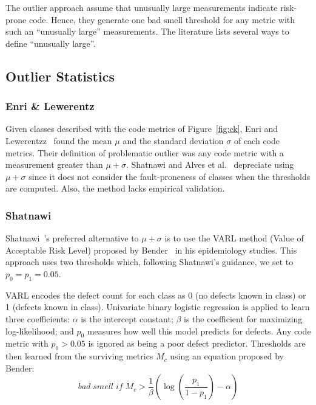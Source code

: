 \documentclass[twocolumn,5p]{elsarticle}
\newcommand{\fig}[1]{Figure~\ref{fig:#1}}
\theoremstyle{break}
\begin{document}
The outlier approach assume that unusually large measurements indicate risk-prone code.
Hence, they generate one bad smell threshold for any metric
with such an ``unusually large'' measurements. 
The literature lists several ways to define ``unusually large''.

\subsection{Outlier Statistics}

\subsubsection{Enri \& Lewerentz}
Given classes described with the  code metrics of \fig{ck},
Enri and Lewerentzz~\cite{erni96} found the   mean $\mu$ and the standard deviation $\sigma$
of each
code metrics. Their definition of problematic outlier was any code
metric with a measurement greater than $\mu+\sigma$.
Shatnawi and Alves et al.~\cite{Shatnawi10,Alves2010} depreciate
using $\mu+\sigma$ since it does not consider the fault-proneness of classes when the thresholds are computed. Also, the method lacks  empirical validation.

\subsubsection{ Shatnawi}
Shatnawi~\cite{Shatnawi10}'s preferred alternative to $\mu+\sigma$
is to use the VARL method (Value of Acceptable Risk Level) proposed by Bender~\cite{bender99} in his epidemiology studies.  This approach uses two
thresholds which, following Shatnawi's guidance, we set to
$p_0=p_1=0.05$. 

VARL encodes the defect count
for each class as 0 (no defects known in class) or 1 (defects known in class).
Univariate binary logistic regression is applied to learn three coefficients:  
 $\alpha$ is the intercept constant;
    $\beta$ is the coefficient for maximizing log-likelihood;
  and $p_0$  
    measures   how well this   model predicts for   defects.
Any code metric with $p_0>0.05$ is  ignored as being a poor defect predictor. Thresholds are then learned from the surviving metrics $M_c$ using
an equation proposed by Bender:
\begin{equation}
 \mathit{bad\; smell\; if\;} M_c > \frac{1}{\beta }\left( {\log \left( {\frac{{{p_1}}}{{1 - {p_1}}}} \right) - \alpha } \right) 
\end{equation}
\end{document}
